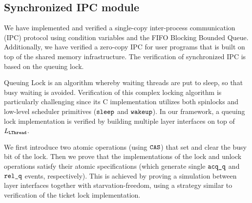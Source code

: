 {%

\subsection{Synchronized IPC module}
\label{sec:con:ipc}
We have implemented and verified a single-copy
inter-process communication (IPC) protocol using condition variables
and the FIFO Blocking Bounded Queue.
Additionally, we have verified a
zero-copy IPC for user programs that is built on top of the
shared memory infrastructure.
The verification of synchronized IPC is based on the 
queuing lock.

Queuing Lock is an algorithm whereby waiting threads are put to sleep,
so that busy waiting is avoided.
Verification of this complex locking algorithm is particularly
challenging since its C implementation utilizes both
spinlocks and low-level scheduler primitives (${\texttt{sleep}}$ and ${\texttt{wakeup}}$).
In our framework, a queuing lock implementation is verified
by building multiple layer interfaces on top of $L_{\texttt{LThread}}$.


We first introduce two atomic operations (using ${\texttt{CAS}}$)
that set and clear the busy bit of the lock.
Then we prove that the implementations
of the lock and unlock operations
satisfy their atomic specifications
(which generate single ${\texttt{acq\_q}}$ and ${\texttt{rel\_q}}$ events, respectively).
This is achieved by proving a simulation between layer interfaces together
with starvation-freedom, using a strategy similar to verification of
the ticket lock implementation.

\ignore{
\begin{figure}
 = C, multicols=2] {source_code/ipc.c}
\caption{Implementation of Single-Copy IPC}
\label{fig:exp:ipc}
\end{figure}

\vspace{-3pt}
\paragraph{Trap handler}
\label{sec:base:trapm}

}}

